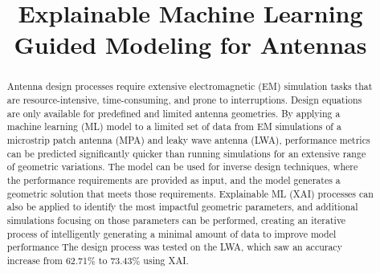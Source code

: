 \documentclass[conference]{IEEEtran}
\begin{document}
\title{Explainable Machine Learning Guided Modeling for Antennas\\
}

\author{
\and
{}
\and
{}
\and
{}
}

\maketitle

\begin{abstract}
    Antenna design processes require extensive electromagnetic (EM) simulation tasks that are resource-intensive, time-consuming, and prone to interruptions. Design equations are only available for predefined and limited antenna geometries. By applying a machine learning (ML) model to a limited set of data from EM simulations of a microstrip patch antenna (MPA) and leaky wave antenna (LWA), performance metrics can be predicted significantly quicker than running simulations for an extensive range of geometric variations. The model can be used for inverse design techniques, where the performance requirements are provided as input, and the model generates a geometric solution that meets those requirements. Explainable ML (XAI) processes can also be applied to identify the most impactful geometric parameters, and additional simulations focusing on those parameters can be performed, creating an iterative process of intelligently generating a minimal amount of data to improve model performance The design process was tested on the LWA, which saw an accuracy increase from 62.71\% to 73.43\% using XAI. 
\end{abstract}
\end{document}
